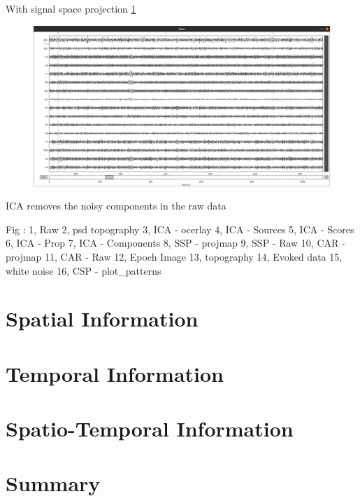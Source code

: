 With signal space projection \ref{fig:obci_ssp}
\begin{figure}[h] 
    \begin{center}
    \includegraphics[height=0.6\textwidth]{images/obci_ssp.png}
    \caption{}
    \label{fig:obci_ssp}
\end{center}
\end{figure}

ICA removes the noisy components in the raw data 

Fig : 1, Raw
2, psd topography
3, ICA - ocerlay
4, ICA - Sources
5, ICA - Scores
6, ICA - Prop
7, ICA - Components
8, SSP - projmap
9, SSP - Raw
10, CAR - projmap
11, CAR - Raw
12, Epoch Image
13, topography
14, Evoked data
15, white noise
16, CSP - plot_patterns

\section{Spatial Information}

\section{Temporal Information}

\section{Spatio-Temporal Information}

\section*{Summary}